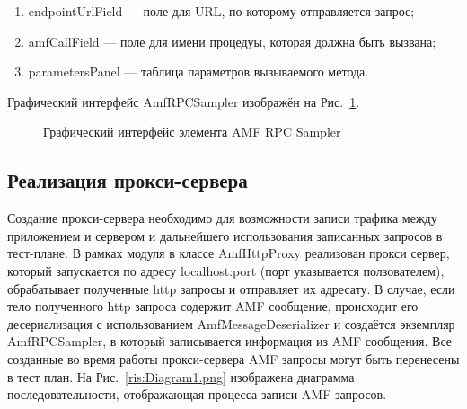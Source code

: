 \begin{enumerate}
\item endpointUrlField --- поле для URL, по которому отправляется запрос;
\item amfCallField --- поле для имени процедуы, которая должна быть вызвана; 
\item parametersPanel --- таблица параметров вызываемого метода.
\end{enumerate}

Графический интерфейс AmfRPCSampler изображён на Рис.~\ref{ris:amfSampler1.png}.

\begin{figure}[ht]
\caption{Графический интерфейс элемента AMF RPC Sampler}
\label{ris:amfSampler1.png}
\end{figure}

\subsection{Реализация прокси-сервера}

Создание прокси-сервера необходимо для возможности записи трафика между приложением и сервером и дальнейшего использования 
записанных запросов в тест-плане. В рамках модуля в классе AmfHttpProxy реализован прокси сервер, который запускается по адресу
localhost:port (порт указывается ползователем), обрабатывает полученные http запросы и отправляет их адресату. 
В случае, если тело полученного http запроса содержит AMF сообщение, происходит его десериализация с использованием 
AmfMessageDeserializer и создаётся экземпляр 
AmfRPCSampler, в который записывается информация из AMF сообщения. Все созданные во время работы прокси-сервера AMF запросы 
могут быть перенесены в тест план. На Рис.~\ref{ris:Diagram1.png} изображена диаграмма последовательности, отображающая
процесса записи AMF запросов.

